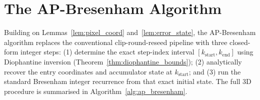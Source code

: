 \documentclass[conference]{IEEEtran}
\begin{document}
\section{The AP-Bresenham Algorithm}
\label{sec:algo}

Building on Lemmas~\ref{lem:pixel_coord} and~\ref{lem:error_state}, the AP-Bresenham algorithm replaces the conventional clip-round-reseed pipeline with three closed-form integer steps: (1) determine the exact step-index interval $[k_{\mathrm{start}}, k_{\mathrm{end}}]$ using Diophantine inversion (Theorem~\ref{thm:diophantine_bounds}); (2) analytically recover the entry coordinates and accumulator state at $k_{\mathrm{start}}$; and (3) run the standard Bresenham integer recurrence from that exact initial state. The full 3D procedure is summarised in Algorithm~\ref{alg:ap_bresenham}.
\end{document}
